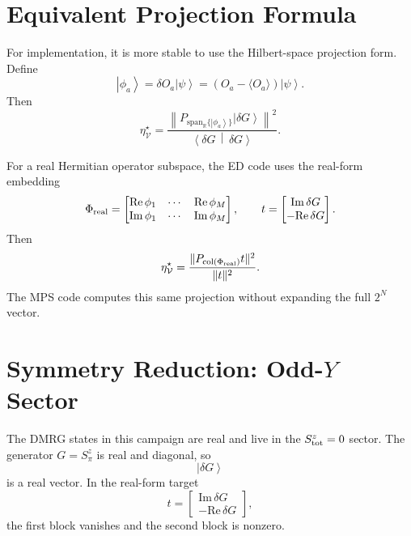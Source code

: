 \documentclass[11pt]{article}
\newcommand{\ket}[1]{\left|#1\right\rangle}
\newcommand{\braket}[2]{\left\langle#1\,\middle|\,#2\right\rangle}
\newcommand{\V}{\mathcal V}
\newcommand{\dd}{\delta}
\begin{document}
\section{Equivalent Projection Formula}

For implementation, it is more stable to use the Hilbert-space
projection form.  Define
\begin{equation}
  \ket{\phi_a}
  =
  \dd O_a\ket{\psi}
  =
  \left(O_a-\langle O_a\rangle\right)\ket{\psi}.
\end{equation}
Then
\begin{equation}
  \eta^\star_{\V}
  =
  \frac{
    \left\|
      P_{\mathrm{span}_{\mathbb R}\{\ket{\phi_a}\}}
      \ket{\dd G}
    \right\|^2
  }{
    \braket{\dd G}{\dd G}
  }.
\end{equation}

For a real Hermitian operator subspace, the ED code uses the real-form
embedding
\begin{equation}
  \Phi_{\rm real}
  =
  \begin{bmatrix}
    \mathrm{Re}\,\phi_1 & \cdots & \mathrm{Re}\,\phi_M\\
    \mathrm{Im}\,\phi_1 & \cdots & \mathrm{Im}\,\phi_M
  \end{bmatrix},
  \qquad
  t
  =
  \begin{bmatrix}
    \mathrm{Im}\,\dd G\\
    -\mathrm{Re}\,\dd G
  \end{bmatrix}.
\end{equation}
Then
\begin{equation}
  \eta^\star_{\V}
  =
  \frac{\|P_{\mathrm{col}(\Phi_{\rm real})}t\|^2}{\|t\|^2}.
\end{equation}
The MPS code computes this same projection without expanding the full
$2^N$ vector.

\section{Symmetry Reduction: Odd-\texorpdfstring{$Y$}{Y} Sector}

The DMRG states in this campaign are real and live in the
$S^z_{\rm tot}=0$ sector.  The generator $G=S^z_\pi$ is real and
diagonal, so
\[
  \ket{\dd G}
\]
is a real vector.  In the real-form target
\[
  t
  =
  \begin{bmatrix}
    \mathrm{Im}\,\dd G\\
    -\mathrm{Re}\,\dd G
  \end{bmatrix},
\]
the first block vanishes and the second block is nonzero.
\end{document}
